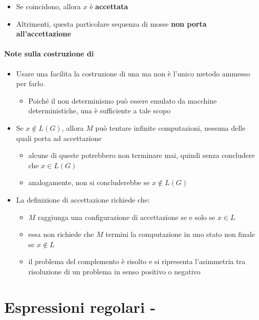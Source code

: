 \documentclass[italian, 10pt]{article}
\begin{document}
\begin{itemize}
  \item[\cmark] Se coincidono, allora \(x\) è \textbf{accettata}
  \item[\xmark] Altrimenti, questa particolare sequenza di mosse \textbf{non porta all'accettazione}
\end{itemize}

\paragraph{Note sulla costruzione di \NTM}

\begin{itemize}
  \item  Usare una \NTM facilita la costruzione di una \GG ma non è l'unico metodo ammesso per farlo.
        \begin{itemize}
          \item Poiché il non determinismo può essere emulato da macchine deterministiche, una \TM è sufficiente a tale scopo
        \end{itemize}
  \item Se \(x \notin L(G)\), allora \(M\) può tentare infinite computazioni, nessuna delle quali porta ad accettazione
        \begin{itemize}
          \item alcune di queste potrebbero non terminare mai, quindi senza concludere che \(x \in L(G)\)
          \item analogamente, non si concluderebbe se \(x \notin L(G)\)
        \end{itemize}
  \item La definizione di accettazione richiede che:
        \begin{itemize}
          \item \(M\) raggiunga una configurazione di accettazione se e solo se \(x \in L\)
          \item essa non richiede che \(M\) termini la computazione in uno stato non finale se \(x \notin L\)
          \item il problema del complemento è risolto e si ripresenta l'asimmetria tra risoluzione di un problema in senso positivo o negativo
        \end{itemize}
\end{itemize}

\clearpage

\section{Espressioni regolari - \RE}
\label{sec:espressioni-regolari}
\end{document}
